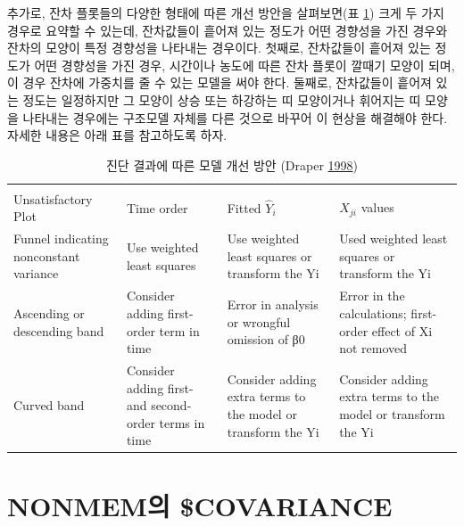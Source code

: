 \documentclass[
  10pt,
  krantz2,
  a4paper]{krantz}
\theoremstyle{definition}
\theoremstyle{definition}
\theoremstyle{definition}
\theoremstyle{remark}
\begin{document}
추가로, 잔차 플롯들의 다양한 형태에 따른 개선 방안을 살펴보면(표 \ref{tab:diag-response}) 크게 두 가지 경우로 요약할 수 있는데, 잔차값들이 흩어져 있는 정도가 어떤 경향성을 가진 경우와 잔차의 모양이 특정 경향성을 나타내는 경우이다. 첫째로, 잔차값들이 흩어져 있는 정도가 어떤 경향성을 가진 경우, 시간이나 농도에 따른 잔차 플롯이 깔때기 모양이 되며, 이 경우 잔차에 가중치를 줄 수 있는 모델을 써야 한다. 둘째로, 잔차값들이 흩어져 있는 정도는 일정하지만 그 모양이 상승 또는 하강하는 띠 모양이거나 휘어지는 띠 모양을 나타내는 경우에는 구조모델 자체를 다른 것으로 바꾸어 이 현상을 해결해야 한다. 자세한 내용은 아래 표를 참고하도록 하자.

\begin{table}

\caption{\label{tab:diag-response}진단 결과에 따른 모델 개선 방안 (Draper \protect\hyperlink{ref-draper1998applied}{1998})}
\centering
\begin{tabular}[t]{>{\raggedright\arraybackslash}p{3cm}>{\raggedright\arraybackslash}p{3cm}>{\raggedright\arraybackslash}p{3cm}>{\raggedright\arraybackslash}p{3cm}}
\toprule
\multicolumn{1}{c}{ } & \multicolumn{3}{c}{Plot of \$\textbackslash{}varepsilon\_i\$ Versus} \\
\cmidrule(l{3pt}r{3pt}){2-4}
Unsatisfactory Plot & Time order & Fitted $\hat{Y}_i$ & $X_{ji}$ values\\
\midrule
Funnel indicating nonconstant variance & Use weighted least squares & Use weighted least squares or transform the Yi & Used weighted least squares or transform the Yi\\
Ascending or descending band & Consider adding first-order term in time & Error in analysis or wrongful omission of β0 & Error in the calculations; first-order effect of Xi not removed\\
Curved band & Consider adding first- and second- order terms in time & Consider adding extra terms to the model or transform the Yi & Consider adding extra terms to the model or transform the Yi\\
\bottomrule
\end{tabular}
\end{table}



\hypertarget{cov}{%
\chapter{NONMEM의 \$COVARIANCE}\label{cov}}
\end{document}
